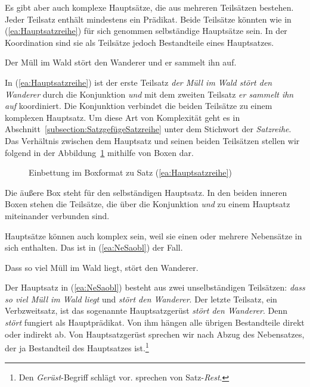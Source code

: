 Es gibt aber auch komplexe Hauptsätze, die aus mehreren Teilsätzen bestehen. Jeder Teilsatz enthält mindestens ein Prädikat. Beide Teilsätze könnten wie in (\ref{ea:Hauptsatzreihe}) für sich genommen selbständige Hauptsätze sein. In der Koordination sind sie als Teilsätze jedoch Bestandteile eines Hauptsatzes.

\ea \label{ea:Hauptsatzreihe} Der Müll im Wald stört den Wanderer und er sammelt ihn auf. 
\z

In (\ref{ea:Hauptsatzreihe}) ist der erste Teilsatz \textit{der Müll im Wald stört den Wanderer} durch die Konjunktion \textit{und} mit dem zweiten Teilsatz \textit{er sammelt ihn auf} koordiniert. Die Konjunktion verbindet die beiden Teilsätze zu einem komplexen Hauptsatz. Um diese Art von Komplexität geht es in Abschnitt~\ref{subsection:SatzgefügeSatzreihe} unter dem Stichwort der \textit{Satzreihe}. Das Verhältnis zwischen dem Hauptsatz und seinen beiden Teilsätzen stellen wir \citet[78]{Pafel2011} folgend in der Abbildung~\ref{fig:TeilKONJTeil} mithilfe von Boxen dar.

\begin{figure}

\caption{\label{fig:TeilKONJTeil} Einbettung im Boxformat zu Satz (\ref{ea:Hauptsatzreihe})}
\end{figure}%

Die äußere Box steht für den selbständigen Hauptsatz. In den beiden inneren Boxen stehen die Teilsätze, die über die Konjunktion \textit{und} zu einem Hauptsatz miteinander verbunden sind. 

Hauptsätze können auch komplex sein, weil sie einen oder mehrere Nebensätze in sich enthalten. Das ist in (\ref{ea:NeSaobl}) der Fall.

\ea \label{ea:NeSaobl} Dass so viel Müll im Wald liegt, stört den Wanderer. 
\z

Der Hauptsatz in (\ref{ea:NeSaobl}) besteht aus zwei unselbständigen Teilsätzen: \textit{dass so viel Müll im Wald liegt} und \textit{stört den Wanderer}. Der letzte Teilsatz, ein Verbzweitsatz, ist das sogenannte Hauptsatzgerüst \textit{stört den Wanderer}. Denn \textit{stört} fungiert als Hauptprädikat. Von ihm hängen alle übrigen Bestandteile direkt oder indirekt ab. Von Hauptsatzgerüst sprechen wir nach Abzug des Nebensatzes, der ja Bestandteil des Hauptsatzes ist.\footnote{Den \textit{Gerüst}-Begriff schlägt \citet[81]{Pafel2011} vor. \citet[27]{Elst_Habermann_SynAn} sprechen von Satz-\textit{Rest}.} 

